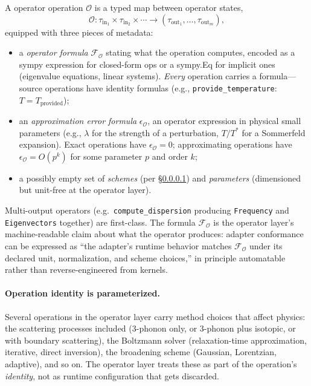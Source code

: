 \documentclass[11pt,a4paper]{article}
\begin{document}
A operator operation $\mathcal{O}$ is a typed map between operator states,
\begin{equation}
  \mathcal{O} : \tau_{\text{in}_1} \times \tau_{\text{in}_2} \times \cdots \to (\tau_{\text{out}_1}, \ldots, \tau_{\text{out}_m}),
\end{equation}
equipped with three pieces of metadata:
\begin{itemize}[leftmargin=2em]
  \item a \emph{operator formula} $\mathcal{F}_\mathcal{O}$ stating what the operation
        computes, encoded as a sympy expression for closed-form ops or a sympy.Eq for
        implicit ones (eigenvalue equations, linear systems). \emph{Every} operation
        carries a formula---source operations have identity formulas (e.g.,
        \texttt{provide\_temperature}: $T = T_{\text{provided}}$);
  \item an \emph{approximation error formula} $\epsilon_{\mathcal{O}}$, an operator
        expression in physical small parameters (e.g., $\lambda$ for the strength of a
        perturbation, $T/T^*$ for a Sommerfeld expansion). Exact operations have
        $\epsilon_{\mathcal{O}} = 0$; approximating operations have
        $\epsilon_{\mathcal{O}} = O(p^k)$ for some parameter $p$ and order $k$;
  \item a possibly empty set of \emph{schemes} (per
        \S\ref{ssec:parameterized-operation-identity}) and \emph{parameters}
        (dimensioned but unit-free at the operator layer).
\end{itemize}
Multi-output operators (e.g.\ \texttt{compute\_dispersion} producing
\texttt{Frequency} and \texttt{Eigenvectors} together) are first-class. The formula
$\mathcal{F}_\mathcal{O}$ is the operator layer's machine-readable claim about what the
operator produces: adapter conformance can be expressed as ``the adapter's runtime
behavior matches $\mathcal{F}_\mathcal{O}$ under its declared unit, normalization,
and scheme choices,'' in principle automatable rather than reverse-engineered
from kernels.


\paragraph{Operation identity is parameterized.}\label{ssec:parameterized-operation-identity}

Several operations in the operator layer carry method choices that affect physics: the scattering
processes included (3-phonon only, or 3-phonon plus isotopic, or with boundary scattering), the
Boltzmann solver (relaxation-time approximation, iterative, direct inversion), the broadening
scheme (Gaussian, Lorentzian, adaptive), and so on. The operator layer treats these as part of the
operation's \emph{identity}, not as runtime configuration that gets discarded.
\end{document}
